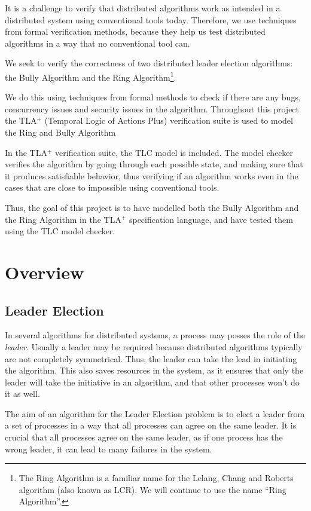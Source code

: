 \documentclass{report}
\begin{document}
It is a challenge to verify that distributed algorithms work as intended in a distributed system using conventional tools today. Therefore, we use techniques from formal verification methods, because they help us test distributed algorithms in a way that no conventional tool can.

We seek to verify the correctness of two distributed leader election algorithms: the Bully Algorithm and the Ring Algorithm\footnote{The Ring Algorithm is a familiar name for the Lelang, Chang and Roberts algorithm (also known as LCR). We will continue to use the name ``Ring Algorithm''.}.

We do this using techniques from formal methods to check if there are any bugs, concurrency issues and security issues in the algorithm. Throughout this project the TLA$^{+}$ (Temporal Logic of Actions Plus) verification suite is used to model the Ring and Bully Algorithm

In the TLA$^{+}$ verification suite, the TLC model is included. The model checker verifies the algorithm by going through each possible state, and making sure that it produces satisfiable behavior, thus verifying if an algorithm works even in the cases that are close to impossible using conventional tools.

Thus, the goal of this project is to have modelled both the Bully Algorithm and the Ring Algorithm in the TLA$^{+}$ specification language, and have tested them using the TLC model checker.

\chapter{Overview}

\section{Leader Election}

In several algorithms for distributed systems, a process may posses the role of the \textit{leader}. Usually a leader may be required because distributed algorithms typically are not completely symmetrical. Thus, the leader can take the lead in initiating the algorithm. This also saves resources in the system, as it ensures that only the leader will take the initiative in an algorithm, and that other processes won't do it as well.

The aim of an algorithm for the Leader Election problem is to elect a leader from a set of processes in a way that all processes can agree on the same leader. It is crucial that all processes agree on the same leader, as if one process has the wrong leader, it can lead to many failures in the system.
\end{document}
